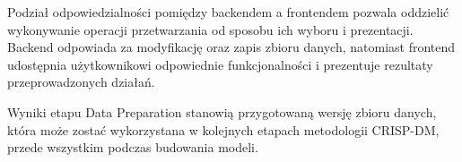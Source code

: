 \documentclass[12pt]{book}
\begin{document}
Podział odpowiedzialności pomiędzy backendem a frontendem pozwala
oddzielić wykonywanie operacji przetwarzania od sposobu ich wyboru i prezentacji.
Backend odpowiada za modyfikację oraz zapis zbioru danych, natomiast frontend
udostępnia użytkownikowi odpowiednie funkcjonalności i prezentuje rezultaty
przeprowadzonych działań.

Wyniki etapu Data Preparation stanowią przygotowaną wersję zbioru danych,
która może zostać wykorzystana w kolejnych etapach metodologii CRISP-DM,
przede wszystkim podczas budowania modeli.






\end{document}

